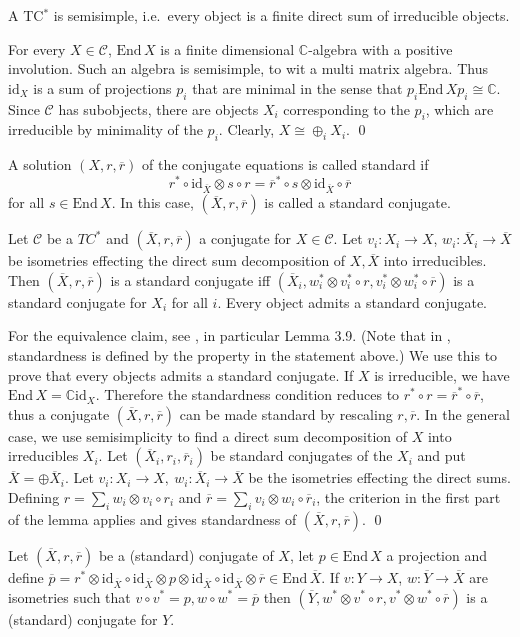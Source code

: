 \documentclass[11pt]{article}
\theoremstyle{definition}
\theoremstyle{definition}
\theoremstyle{remark}
\def\2#1{{\mathcal #1}}
\def\7#1{{\mathbb #1}}
\def\ol#1{{\overline #1}}
\newcommand{\End}{\mathrm{End}}
\newcommand{\mcirc}{\circ}
\newcommand{\rarr}{\rightarrow}
\def\id{\mathrm{id}}
\begin{document}
\blemma \label{lem-semisim} 
A TC$^*$ is semisimple, i.e.\ every object is a finite direct sum of irreducible objects.
\elemma

\prf For every $X\in\2C$, $\End\,X$ is a finite dimensional $\7C$-algebra with a positive
involution. Such an algebra is semisimple, to wit a multi matrix algebra. Thus $\id_X$ is a sum of
projections $p_i$ that are minimal in the sense that $p_i\End\,Xp_i\cong\7C$. Since $\2C$ has
subobjects, there are objects $X_i$ corresponding to the $p_i$, which are irreducible by minimality
of the $p_i$. Clearly, $X\cong\oplus_iX_i$.
\qed

\bdefin {}
A solution $(X,r,\ol{r})$ of the conjugate equations is called standard if
\[ r^* \mcirc \id_{\ol{X}}\otimes s\mcirc r= \ol{r}^*\circ s\otimes\id_{\ol{X}}\circ\ol{r} \]
for all $s\in\End\,X$. In this case, $(\ol{X},r,\ol{r})$ is called a standard conjugate.
\edefin

\blemma \label{lem-stand1}
Let $\2C$ be a $TC^*$ and $(\ol{X},r,\ol{r})$ a conjugate for $X\in\2C$. Let $v_i:X_i\rarr X$,
$w_i:\ol{X_i}\rarr\ol{X}$ be isometries effecting the direct sum decomposition of $X,\ol{X}$ into
irreducibles. Then $(\ol{X},r,\ol{r})$ is a standard conjugate iff
$(\ol{X_i},w_i^*\otimes v_i^*\circ r,v_i^*\otimes w_i^*\circ\ol{r})$ 
is a standard conjugate for $X_i$ for all $i$. Every object admits a standard conjugate.
\elemma

\prf For the equivalence claim, see \cite{LR}, in particular Lemma 3.9. (Note that in \cite{LR},
standardness is defined by the property in the statement above.) We use this to prove that every
objects admits a standard conjugate. If $X$ is irreducible, we have $\End\,X=\7C\id_X$. Therefore
the standardness condition reduces to $r^*\circ r=\ol{r}^*\circ\ol{r}$, thus a conjugate
$(\ol{X},r,\ol{r})$ can be made standard by rescaling $r,\ol{r}$. In the general case, we use
semisimplicity to find a direct sum decomposition of $X$ into irreducibles $X_i$.  
Let $(\ol{X_i},r_i,\ol{r}_i)$ be standard conjugates of the $X_i$ and put $\ol{X}=\oplus\ol{X}_i$.
Let $v_i:X_i\rarr X,\ w_i:\ol{X}_i\rarr\ol{X}$ be the isometries effecting the direct sums. Defining
$r=\sum_i w_i\otimes v_i\circ r_i$ and $\ol{r}=\sum_i v_i\otimes w_i\circ\ol{r}_i$, the criterion in
the first part of the lemma applies and gives standardness of $(\ol{X},r,\ol{r})$.
\qed

\blemma \label{lem-conj}
Let $(\ol{X},r,\ol{r})$ be a (standard) conjugate of $X$, let $p\in\End\,X$ a projection and define
$\ol{p}=r^*\otimes\id_{\ol{X}}\mcirc\id_{\ol{X}}\otimes p\otimes\id_{\ol{X}}\mcirc\id_{\ol{X}}\otimes\ol{r}\in\End\,\ol{X}$.
If $v: Y\rarr X$, $w:\ol{Y}\rarr\ol{X}$ are isometries such that $v\circ v^*=p, w\circ w^*=\ol{p}$ then
$(\ol{Y},w^*\otimes v^*\mcirc r,v^*\otimes w^*\mcirc\ol{r})$ is a (standard) conjugate for $Y$.
\elemma
\end{document}
